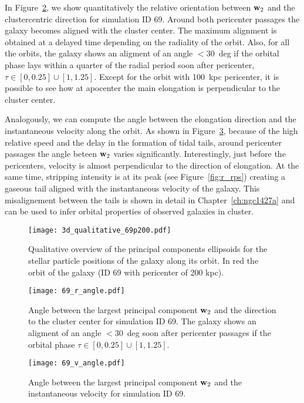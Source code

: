 In Figure~\ref{fig:pca_angle_r}, we show quantitatively the relative orientation between $\boldsymbol{\mathbf{w}}_2$ and the clustercentric direction for simulation ID 69.
Around both pericenter passages the galaxy becomes aligned with the cluster center.
The maximum alignment is obtained at a delayed time depending on the radiality of the orbit.
Also, for all the orbits, the galaxy shows an aligment of an angle $<30$~deg if the orbital phase lays within a quarter of the radial period soon after pericenter, \ie{} $\tau \in [0, 0.25] \cup{} [1, 1.25]$.
Except for the orbit with 100~kpc pericenter, it is possible to see how at apocenter the main elongation is perpendicular to the cluster center. %

Analogously, we can compute the angle between the elongation direction and the instantaneous velocity along the orbit.
As shown in Figure~\ref{fig:pca_angle_v}, because of the high relative speed and the delay in the formation of tidal tails, around pericenter passages the angle beteen $\boldsymbol{\mathbf{w}}_2$ varies significantly.
Interestingly, just before the pericenters, velocity is almost perpendicular to the direction of elongation.
At the same time, stripping intensity is at its peak (see Figure~\ref{fig:r_rps}) creating a gaseous tail aligned with the instantaneous velocity of the galaxy.
This misalignement between the tails is shown in detail in Chapter~\ref{ch:ngc1427a} and can be used to infer orbital properties of observed galaxies in cluster.

\begin{figure}
\centering
\texttt{[image: 3d\_qualitative\_69p200.pdf]}
\caption{Qualitative overview of the principal components ellipsoids for the stellar particle positions of the galaxy along its orbit.
In red the orbit of the galaxy (ID 69 with pericenter of 200 kpc).}
\label{fig:pca}
\end{figure}

\begin{figure}
\centering
\texttt{[image: 69\_r\_angle.pdf]}
\caption{Angle between the largest principal component $\boldsymbol{\mathbf{w}}_2$ and the direction to the cluster center for simulation ID 69. The galaxy shows an aligment of an angle $<30$~deg soon after pericenter passages \ie{} if the orbital phase $\tau \in [0, 0.25] \cup{} [1, 1.25]$.}
\label{fig:pca_angle_r}
\end{figure}
\begin{figure}
\centering
\texttt{[image: 69\_v\_angle.pdf]}
\caption{Angle between the largest principal component $\boldsymbol{\mathbf{w}}_2$ and the instantaneous velocity for simulation ID 69.}
\label{fig:pca_angle_v}
\end{figure}

